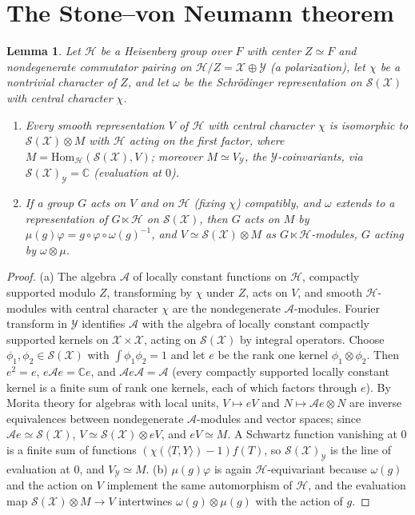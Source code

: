 \documentclass[11pt,oneside,notitlepage]{book}
\numberwithin{equation}{section}
\theoremstyle{plain}
\newtheorem{lemma}[theorem]{Lemma}
\theoremstyle{definition}
\newcommand{\C}{\mathbb{C}}
\newcommand{\cS}{\mathcal{S}}
\begin{document}
\section{The Stone--von Neumann theorem}

\begin{lemma}\label{lem:SvN}
Let $\mathcal H$ be a Heisenberg group over $F$ with center $Z\simeq F$ and nondegenerate commutator pairing on $\mathcal H/Z=\mathcal X\oplus\mathcal Y$ (a polarization), let $\chi$ be a nontrivial character of $Z$, and let $\omega$ be the Schr\"odinger representation on $\cS(\mathcal X)$ with central character $\chi$.
\begin{enumerate}[label=(\alph*)]
\item Every smooth representation $V$ of $\mathcal H$ with central character $\chi$ is isomorphic to $\cS(\mathcal X)\otimes M$ with $\mathcal H$ acting on the first factor, where $M=\mathrm{Hom}_{\mathcal H}(\cS(\mathcal X),V)$; moreover $M\simeq V_{\mathcal Y}$, the $\mathcal Y$-coinvariants, via $\cS(\mathcal X)_{\mathcal Y}=\C$ (evaluation at $0$).
\item If a group $G$ acts on $V$ and on $\mathcal H$ (fixing $\chi$) compatibly, and $\omega$ extends to a representation of $G\ltimes\mathcal H$ on $\cS(\mathcal X)$, then $G$ acts on $M$ by $\mu(g)\varphi=g\circ\varphi\circ\omega(g)^{-1}$, and $V\simeq\cS(\mathcal X)\otimes M$ as $G\ltimes\mathcal H$-modules, $G$ acting by $\omega\otimes\mu$.
\end{enumerate}
\end{lemma}
\begin{proof}
(a) The algebra $\mathcal A$ of locally constant functions on $\mathcal H$, compactly supported modulo $Z$, transforming by $\chi$ under $Z$, acts on $V$, and smooth $\mathcal H$-modules with central character $\chi$ are the nondegenerate $\mathcal A$-modules. Fourier transform in $\mathcal Y$ identifies $\mathcal A$ with the algebra of locally constant compactly supported kernels on $\mathcal X\times\mathcal X$, acting on $\cS(\mathcal X)$ by integral operators. Choose $\phi_1,\phi_2\in\cS(\mathcal X)$ with $\int\phi_1\phi_2=1$ and let $e$ be the rank one kernel $\phi_1\otimes\phi_2$. Then $e^2=e$, $e\mathcal Ae=\C e$, and $\mathcal Ae\mathcal A=\mathcal A$ (every compactly supported locally constant kernel is a finite sum of rank one kernels, each of which factors through $e$). By Morita theory for algebras with local units, $V\mapsto eV$ and $N\mapsto\mathcal Ae\otimes N$ are inverse equivalences between nondegenerate $\mathcal A$-modules and vector spaces; since $\mathcal Ae\simeq\cS(\mathcal X)$, $V\simeq\cS(\mathcal X)\otimes eV$, and $eV\simeq M$. A Schwartz function vanishing at $0$ is a finite sum of functions $(\chi(\langle T,Y\rangle)-1)f(T)$, so $\cS(\mathcal X)_{\mathcal Y}$ is the line of evaluation at $0$, and $V_{\mathcal Y}\simeq M$.
(b) $\mu(g)\varphi$ is again $\mathcal H$-equivariant because $\omega(g)$ and the action on $V$ implement the same automorphism of $\mathcal H$, and the evaluation map $\cS(\mathcal X)\otimes M\to V$ intertwines $\omega(g)\otimes\mu(g)$ with the action of $g$.
\end{proof}
\end{document}
